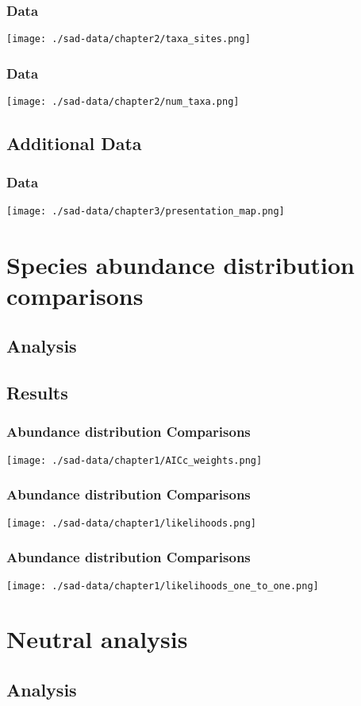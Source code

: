 \documentclass[17pt]{beamer}
\begin{document}
\begin{frame}{}
\frametitle{Data}
\texttt{[image: ./sad-data/chapter2/taxa\_sites.png]}
\end{frame}

\begin{frame}{}
\frametitle{Data}
\texttt{[image: ./sad-data/chapter2/num\_taxa.png]}
\end{frame}



\subsection{Additional Data}

\begin{frame}{}
\frametitle{Data}
\texttt{[image: ./sad-data/chapter3/presentation\_map.png]}
\end{frame}



\section{Species abundance distribution comparisons}
\subsection{Analysis}
\subsection{Results}
\begin{frame}{}
\frametitle{Abundance distribution Comparisons}
\texttt{[image: ./sad-data/chapter1/AICc\_weights.png]}
\end{frame}

\begin{frame}{}
\frametitle{Abundance distribution Comparisons}
\texttt{[image: ./sad-data/chapter1/likelihoods.png]}
\end{frame}

\begin{frame}{}
\frametitle{Abundance distribution Comparisons}
\texttt{[image: ./sad-data/chapter1/likelihoods\_one\_to\_one.png]}
\end{frame}

\section{Neutral analysis}
\subsection{Analysis}
\end{document}
